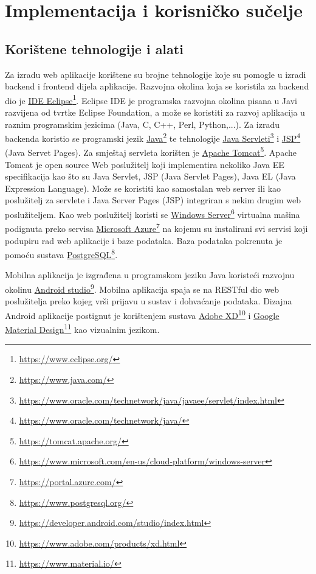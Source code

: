 \chapter{Implementacija i korisničko sučelje}
		
		
		\section{Korištene tehnologije i alati}
		
		Za izradu web aplikacije korištene su brojne tehnologije koje su pomogle u izradi backend i frontend dijela aplikacije. Razvojna okolina koja se koristila za backend dio je \underline{IDE Eclipse}\footnote{\url{https://www.eclipse.org/}}. Eclipse IDE je programska razvojna okolina pisana u Javi razvijena od tvrtke Eclipse Foundation, a može se koristiti za razvoj aplikacija u raznim programskim jezicima (Java, C, C++, Perl, Python,...). Za izradu backenda koristio se programski jezik \underline{Java}\footnote{\url{https://www.java.com/}} te tehnologije \underline{Java Servleti}\footnote{\url{https://www.oracle.com/technetwork/java/javaee/servlet/index.html}} i \underline{JSP}\footnote{\url{https://www.oracle.com/technetwork/java/}} (Java Servet Pages). Za smještaj servleta korišten je \underline{Apache Tomcat}\footnote{\url{https://tomcat.apache.org/}}. Apache Tomcat je open source Web poslužitelj koji implementira nekoliko Java EE specifikacija kao što su Java Servlet, JSP (Java Servlet Pages), Java EL (Java Expression Language). Može se koristiti kao samostalan web server ili kao poslužitelj za servlete i Java Server Pages (JSP) integriran s nekim drugim web poslužiteljem.
		Kao web poslužitelj koristi se \underline{Windows Server}\footnote{\url{https://www.microsoft.com/en-us/cloud-platform/windows-server}} virtualna mašina podignuta preko servisa \underline{Microsoft Azure}\footnote{\url{https://portal.azure.com/}} na kojemu su instalirani svi servisi koji podupiru rad web aplikacije i baze podataka. Baza podataka pokrenuta je pomoću sustava \underline{PostgreSQL}\footnote{\url{https://www.postgresql.org/}}. 
		
		Mobilna aplikacija je izgrađena u programskom jeziku Java koristeći razvojnu okolinu \underline{Android studio}\footnote{\url{https://developer.android.com/studio/index.html}}. Mobilna aplikacija spaja se na RESTful dio web poslužitelja preko kojeg vrši prijavu u sustav i dohvaćanje podataka. Dizajna Android aplikacije postignut je korištenjem sustava \underline{Adobe XD}\footnote{\url{https://www.adobe.com/products/xd.html}} i \underline{Google Material Design}\footnote{\url{https://www.material.io/}} kao vizualnim jezikom.
		
